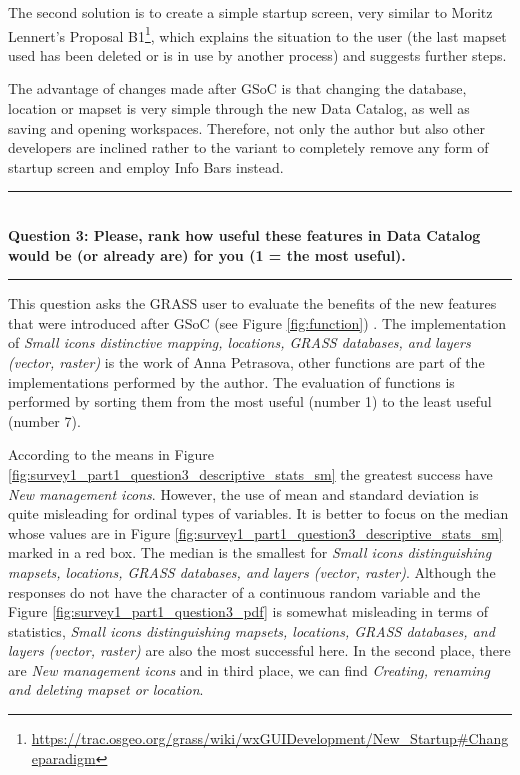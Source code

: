 \documentclass[a4paper,10pt,twoside]{article}
\begin{document}
The second solution is to create a simple startup screen, very similar
to Moritz Lennert's Proposal
B1\footnote{\url{https://trac.osgeo.org/grass/wiki/wxGUIDevelopment/New\_Startup\#Changeparadigm}},
which explains the situation to the user (the last mapset used has
been deleted or is in use by another process) and suggests further
steps.

The advantage of changes made after GSoC is that changing the
database, location or mapset is very simple through the new Data
Catalog, as well as saving and opening workspaces. Therefore, not only
the author but also other developers are inclined rather to the
variant to completely remove any form of startup screen and employ
Info Bars instead.

\par\noindent\rule{\textwidth}{0.4pt} \\
\noindent \textbf{Question 3: Please, rank how useful these features in Data Catalog would be (or already are) for you (1 = the most useful).}
\par\noindent\rule{\textwidth}{0.4pt}

\noindent This question asks the GRASS user to evaluate the benefits
of the new features that were introduced after GSoC (see Figure
\ref{fig:function}) . The implementation of \textit{Small icons
  distinctive mapping, locations, GRASS databases, and layers (vector,
  raster)} is the work of Anna Petrasova, other functions are part of
the implementations performed by the author. The evaluation of
functions is performed by sorting them from the most useful (number 1)
to the least useful (number 7).

According to the means in Figure
\ref{fig:survey1_part1_question3_descriptive_stats_sm} the greatest
success have \textit{New management icons}. However, the use of mean
and standard deviation is quite misleading for ordinal types of
variables. It is better to focus on the median whose values are in
Figure \ref{fig:survey1_part1_question3_descriptive_stats_sm} marked
in a red box. The median is the smallest for \textit{Small icons
  distinguishing mapsets, locations, GRASS databases, and layers
  (vector, raster)}. Although the responses do not have the character
of a continuous random variable and the Figure
\ref{fig:survey1_part1_question3_pdf} is somewhat misleading in terms
of statistics, \textit{Small icons distinguishing mapsets, locations,
  GRASS databases, and layers (vector, raster) } are also the most
successful here. In the second place, there are \textit{New management
  icons} and in third place, we can find \textit{Creating, renaming
  and deleting mapset or location}.
\end{document}

